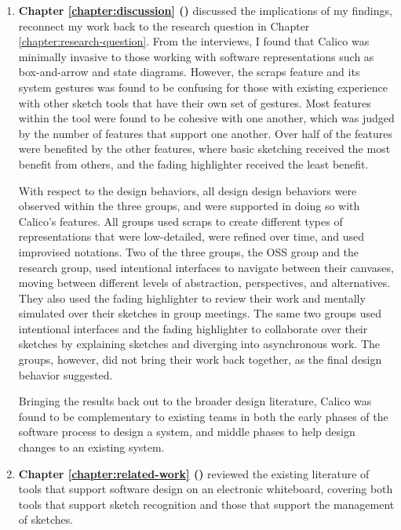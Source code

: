 \documentclass[12pt,fleqn]{ucithesis}
\begin{document}
\begin{enumerate}
   \item \textbf{Chapter \ref{chapter:discussion} ()} discussed the implications of my findings, reconnect my work back to the research question in Chapter \ref{chapter:research-question}. From the interviews, I found that Calico was minimally invasive to those working with software representations such as box-and-arrow and state diagrams. However, the scraps feature and its system gestures was found to be confusing for those with existing experience with other sketch tools that have their own set of gestures. Most features within the tool were found to be cohesive with one another, which was judged by the number of features that support one another. Over half of the features were benefited by the other features, where basic sketching received the most benefit from others, and the fading highlighter received the least benefit. 

   With respect to the design behaviors, all design design behaviors were observed within the three groups, and were supported in doing so with Calico's features. All groups used scraps to create different types of representations that were low-detailed, were refined over time, and used improvised notations. Two of the three groups, the OSS group and the research group, used intentional interfaces to navigate between their canvases, moving between different levels of abstraction, perspectives, and alternatives. They also used the fading highlighter to review their work and mentally simulated over their sketches in group meetings. The same two groups used intentional interfaces and the fading highlighter to collaborate over their sketches by explaining sketches and diverging into asynchronous work. The groups, however, did not bring their work back together, as the final design behavior suggested.

   Bringing the results back out to the  broader design literature, Calico was found to be complementary to existing teams in both the early phases of the software process to design a system, and middle phases to help design changes to an existing system.  

   \item \textbf{Chapter \ref{chapter:related-work} ()} reviewed the existing literature of tools that support software design on an electronic whiteboard, covering both tools that support sketch recognition and those that support the management of sketches.
 \end{enumerate}
\end{document}
